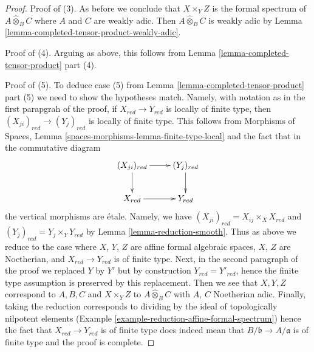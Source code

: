 \documentclass{stacks-project}
\theoremstyle{plain}
\theoremstyle{definition}
\theoremstyle{remark}
\numberwithin{equation}{subsection}
\begin{document}
\begin{proof}
\medskip\noindent
Proof of (3). As before we conclude that $X \times_Y Z$ is the formal spectrum
of $A \widehat{\otimes}_B C$ where $A$ and $C$ are weakly adic.
Then $A \widehat{\otimes}_B C$ is weakly adic by 
Lemma \ref{lemma-completed-tensor-product-weakly-adic}.

\medskip\noindent
Proof of (4). Arguing as above, this follows from
Lemma \ref{lemma-completed-tensor-product} part (4).

\medskip\noindent
Proof of (5). To deduce case (5) from
Lemma \ref{lemma-completed-tensor-product} part (5)
we need to show the hypotheses match.
Namely, with notation as in the first parapgrah of the proof,
if $X_{red} \to Y_{red}$ is locally of finite type, then
$(X_{ji})_{red} \to (Y_j)_{red}$ is locally of finite type. This follows
from Morphisms of Spaces, Lemma \ref{spaces-morphisms-lemma-finite-type-local}
and the fact that in the commutative diagram
$$
\xymatrix{
(X_{ji})_{red} \ar[d] \ar[r] & (Y_j)_{red} \ar[d] \\
X_{red} \ar[r] & Y_{red}
}
$$
the vertical morphisms are \'etale. Namely, we have
$(X_{ji})_{red} = X_{ij} \times_X X_{red}$ and
$(Y_j)_{red} = Y_j \times_Y Y_{red}$
by Lemma \ref{lemma-reduction-smooth}. Thus as above we reduce
to the case where $X$, $Y$, $Z$ are affine formal algebraic spaces,
$X$, $Z$ are Noetherian, and $X_{red} \to Y_{red}$ is of finite type.
Next, in the second paragraph of the proof we replaced $Y$ by $Y'$
but by construction $Y_{red} = Y'_{red}$, hence the finite type
assumption is preserved by this replacement. Then we see that
$X, Y, Z$ correspond to $A, B, C$ and $X \times_Y Z$ to
$A \widehat{\otimes}_B C$ with $A$, $C$ Noetherian adic.
Finally, taking the reduction corresponds to dividing by the
ideal of topologically nilpotent elements
(Example \ref{example-reduction-affine-formal-spectrum})
hence the fact that $X_{red} \to Y_{red}$ is of finite type
does indeed mean that $B/\mathfrak b \to A/\mathfrak a$ is of finite type
and the proof is complete.
\end{proof}
\end{document}
